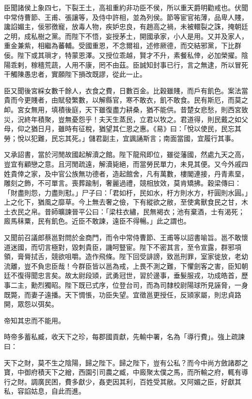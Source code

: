 \begin{pinyinscope}
臣聞諸侯上象四七，下裂王土，高祖重約非功臣不侯，所以重天爵明勸戒也。伏聞中常侍曹節、王甫、張讓等，及侍中許相，並為列侯。節等宦官祐薄，品卑人賤，讒諂媚主，佞邪徼寵，放毒人物，疾妒忠良，有趙高之禍，未被轘裂之誅，掩朝廷之明，成私樹之黨。而陛下不悟，妄授茅土，開國承家，小人是用。又并及家人，重金兼紫，相繼為蕃輔。受國重恩，不念爾祖，述修厥德，而交結邪黨，下比群佞。陛下或其瑣才，特蒙恩澤。又授位乖越，賢才不升，素餐私倖，必加榮擢。陰陽乖剌，稼穡荒蔬，人用不康，罔不由茲。臣誠知封事已行，言之無逮，所以冒死干觸陳愚忠者，實願陛下損改既謬，從此一止。

臣又聞後宮綵女數千餘人，衣食之費，日數百金。比穀雖賤，而戶有飢色。案法當貴而今更賤者，由賦發繁數，以解縣官，寒不敢衣，飢不敢食。民有斯厄，而莫之卹。宮女無用，填積後庭，天下雖復盡力耕桑，猶不能供。昔楚女悲愁，則西宮致災，況終年積聚，豈無憂怨乎！夫天生蒸民，立君以牧之。君道得，則民戴之如父母，仰之猶日月，雖時有征稅，猶望其仁恩之惠。《易》曰：「悅以使民，民忘其勞；悅以犯難，民忘其死。」儲君副主，宜諷誦斯言；南面當國，宜履行其事。

又承詔書，當於河閒故國起解瀆之館。陛下龍飛即位，雖從藩國，然處九天之高，豈宜有顧戀之意。且河閒疏遠，解瀆毙絕，而當勞民單力，未見其便。又今外戚四姓貴倖之家，及中官公族無功德者，造起館舍，凡有萬數，樓閣連接，丹青素堊，雕刻之飾，不可單言。喪葬踰制，奢麗過禮，競相放效，莫肯矯拂。穀梁傳曰：「財盡則怨，力盡則懟。」尸子曰：「君如杅，民如水，杅方則水方，杅圓則水圓。」上之化下，猶風之靡草。今上無去奢之儉，下有縱欲之敝，至使禽獸食民之甘，木土衣民之帛。昔師曠諫晉平公曰：「梁柱衣繡，民無褐衣；池有棄酒，士有渴死；廄馬秣粟，民有飢色。近臣不敢諫，遠臣不得暢。」此之謂也。

又聞前召議郎蔡邕對問於金商門，而令中常侍曹節、王甫等以詔書喻旨。邕不敢懷道迷國，而切言極對，毀刺貴臣，譏呵豎宦。陛下不密其言，至令宣露，群邪項領，膏脣拭舌，競欲咀嚼。造作飛條。陛下回受誹謗，致邕刑罪，室家徙放，老幼流離，豈不負忠臣哉！今群臣皆以邕為戒，上畏不測之難，下懼劍客之害，臣知朝廷不復得聞忠言矣。故太尉段熲，武勇冠世，習於邊事，垂髮服戎，功成皓首，歷事二主，勳烈獨昭。陛下既已式序，位登台司，而為司隸校尉陽球所見誣脅，一身既斃，而妻子遠播。天下惆悵，功臣失望。宜徵邕更授任，反熲家屬，則忠貞路開，眾怨以弭矣。

帝知其忠而不能用。

時帝多蓄私臧，收天下之珍，每郡國貢獻，先輸中署，名為「導行費」。強上疏諫曰：

天下之財，莫不生之陰陽，歸之陛下。歸之陛下，豈有公私？而今中尚方斂諸郡之寶，中御府積天下之繒，西園引司農之臧，中廄聚太僕之馬，而所輸之府，輒有導行之財。調廣民困，費多獻少，姦吏因其利，百姓受其敝。又阿媚之臣，好獻其私，容諂姑息，自此而進。


\end{pinyinscope}
